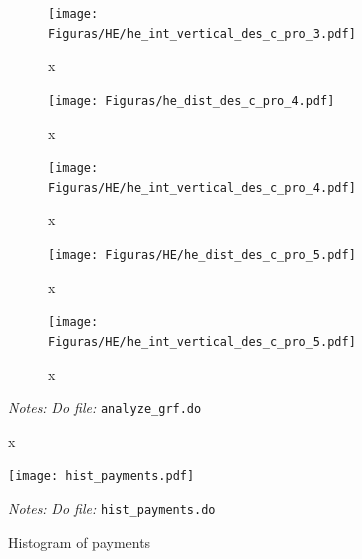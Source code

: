 \documentclass[11pt]{article}
\begin{document}
\begin{figure}[H]
\begin{center}
    \begin{subfigure}{0.3\textwidth}
        \caption{x}
        \centering
        \texttt{[image: Figuras/HE/he\_int\_vertical\_des\_c\_pro\_3.pdf]}
    \end{subfigure}
     \begin{subfigure}{0.3\textwidth}
      \caption{x}
        \centering
        \texttt{[image: Figuras/he\_dist\_des\_c\_pro\_4.pdf]}
    \end{subfigure}
    \begin{subfigure}{0.3\textwidth}
        \caption{x}
        \centering
        \texttt{[image: Figuras/HE/he\_int\_vertical\_des\_c\_pro\_4.pdf]}
    \end{subfigure}
    \begin{subfigure}{0.3\textwidth}
      \caption{x}
        \centering
        \texttt{[image: Figuras/HE/he\_dist\_des\_c\_pro\_5.pdf]}
    \end{subfigure} 
    \begin{subfigure}{0.3\textwidth}
        \caption{x}
        \centering
        \texttt{[image: Figuras/HE/he\_int\_vertical\_des\_c\_pro\_5.pdf]}
    \end{subfigure}
    \end{center}
     \footnotesize \textit{Notes: } 
      \footnotesize{ \textit{Do file: }  \texttt{analyze\_grf.do}}
\end{figure}


\begin{figure}[H]
        \caption{Histogram of payments}
    \label{HistPayments}
    \begin{center}
        \centering
        \texttt{[image: hist\_payments.pdf]}
    \end{center}
     \footnotesize \textit{Notes: } 
      \footnotesize{ \textit{Do file: }  \texttt{hist\_payments.do}}
\end{figure}
\end{document}
